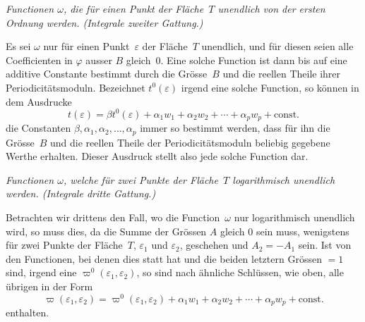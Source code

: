 \documentclass[a4paper,12pt,leqno]{article}
\begin{document}
\medbreak

{\itshape
Functionen $\omega$, die f\"{u}r einen Punkt der Fl\"{a}che~$T$
unendlich von der ersten Ordnung werden.  (Integrale zweiter
Gattung.)}

\nobreak\medskip

Es sei $\omega$ nur f\"{u}r einen Punkt~$\varepsilon$ der
Fl\"{a}che~$T$ unendlich, und f\"{u}r diesen seien alle
Coefficienten in $\varphi$ ausser $B$ gleich~$0$.  Eine solche
Function ist dann bis auf eine additive Constante bestimmt durch
die Gr\"{o}sse~$B$ und die reellen Theile ihrer
Periodicit\"{a}tsmoduln.  Bezeichnet $t^0(\varepsilon)$ irgend
eine solche Function, so k\"{o}nnen in dem Ausdrucke
\[ t(\varepsilon)
   = \beta t^0(\varepsilon)
      + \alpha_1 w_1 + \alpha_2 w_2 + \cdots
      + \alpha_p w_p + \mbox{const.} \]
die Constanten
$\beta, \alpha_1, \alpha_2,\ldots, \alpha_p$
immer so bestimmt werden, dass f\"{u}r ihn die Gr\"{o}sse~$B$ und
die reellen Theile der Periodicit\"{a}tsmoduln beliebig gegebene
Werthe erhalten.  Dieser Ausdruck stellt also jede solche
Function dar.

\medbreak

{\itshape
Functionen $\omega$, welche f\"{u}r zwei Punkte der
Fl\"{a}che~$T$ logarithmisch unendlich werden.  (Integrale dritte
Gattung.)}

\nobreak\medskip

Betrachten wir drittens den Fall, wo die Function~$\omega$ nur
logarithmisch unendlich wird, so muss dies, da die Summe der
Gr\"{o}ssen $A$ gleich $0$ sein muss, wenigstens f\"{u}r zwei
Punkte der Fl\"{a}che~$T$, $\varepsilon_1$ und $\varepsilon_2$,
geschehen und $A_2 = - A_1$ sein.  Ist von den Functionen, bei
denen dies statt hat und die beiden letztern Gr\"{o}ssen $= 1$
sind, irgend eine
$\varpi^0(\varepsilon_1, \varepsilon_2)$,
so sind nach \"{a}hnliche Schl\"{u}ssen, wie oben, alle
\"{u}brigen in der Form
\[ \varpi(\varepsilon_1, \varepsilon_2)
   = \varpi^0(\varepsilon_1, \varepsilon_2)
      + \alpha_1 w_1 + \alpha_2 w_2 + \cdots
      + \alpha_p w_p + \mbox{const.} \]
enthalten.
\end{document}
